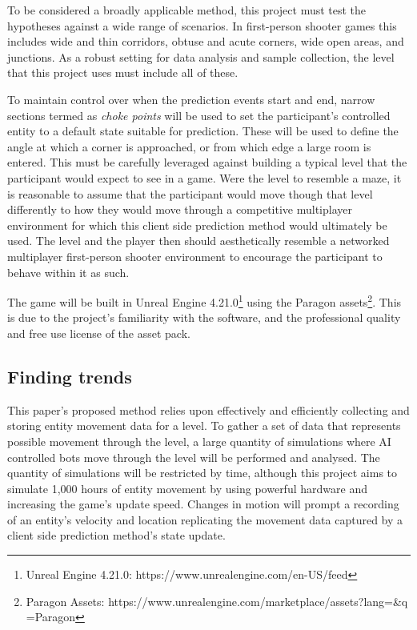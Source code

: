 \documentclass[journal]{IEEEtran}
\begin{document}
To be considered a broadly applicable method, this project must test the hypotheses against a wide range of scenarios. In first-person shooter games this includes wide and thin corridors, obtuse and acute corners, wide open areas, and junctions. As a robust setting for data analysis and sample collection, the level that this project uses must include all of these.

To maintain control over when the prediction events start and end, narrow sections termed as \textit{choke points} will be used to set the participant's controlled entity to a default state suitable for prediction. These will be used to define the angle at which a corner is approached, or from which edge a large room is entered. This must be carefully leveraged against building a typical level that the participant would expect to see in a game. Were the level to resemble a maze, it is reasonable to assume that the participant would move though that level differently to how they would move through a competitive multiplayer environment for which this client side prediction method would ultimately be used. The level and the player then should aesthetically resemble a networked multiplayer first-person shooter environment to encourage the participant to behave within it as such.

The game will be built in Unreal Engine 4.21.0\footnote[1]{Unreal Engine 4.21.0: https://www.unrealengine.com/en-US/feed} using the Paragon assets\footnote[2]{Paragon Assets: https://www.unrealengine.com/marketplace/assets?lang=&q =Paragon}. This is due to the project's familiarity with the software, and the professional quality and free use license of the asset pack.

\subsection{Finding trends}

This paper's proposed method relies upon effectively and efficiently collecting and storing entity movement data for a level. To gather a set of data that represents possible movement through the level, a large quantity of simulations where AI controlled bots move through the level will be performed and analysed. The quantity of simulations will be restricted by time, although this project aims to simulate 1,000 hours of entity movement by using powerful hardware and increasing the game's update speed. Changes in motion will prompt a recording of an entity's velocity and location replicating the movement data captured by a client side prediction method's state update.
\end{document}
